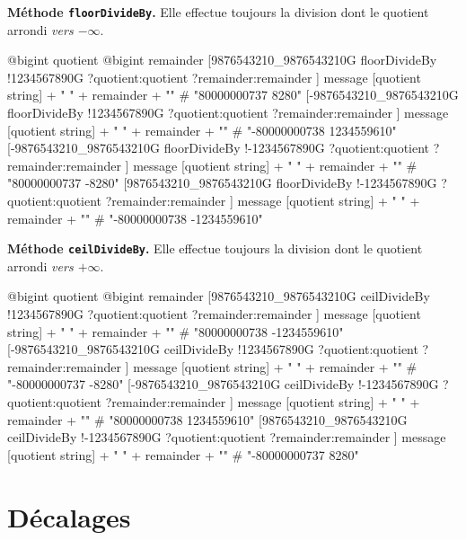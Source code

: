 \textbf{Méthode \texttt{floorDivideBy}.} Elle effectue toujours la division dont le quotient arrondi \emph{vers $-\infty$}.

\begin{galgas}
  @bigint quotient
  @bigint remainder
  [9876543210_9876543210G floorDivideBy
    !1234567890G
    ?quotient:quotient
    ?remainder:remainder
  ]
  message [quotient string] + " " + remainder + "\n" # "80000000737 8280"
  [-9876543210_9876543210G floorDivideBy
    !1234567890G
    ?quotient:quotient
    ?remainder:remainder
  ]
  message [quotient string] + " " + remainder + "\n" # "-80000000738 1234559610"
  [-9876543210_9876543210G floorDivideBy
    !-1234567890G
    ?quotient:quotient
    ?remainder:remainder
  ]
  message [quotient string] + " " + remainder + "\n" # "80000000737 -8280"
  [9876543210_9876543210G floorDivideBy
    !-1234567890G
    ?quotient:quotient
    ?remainder:remainder
  ]
  message [quotient string] + " " + remainder + "\n" # "-80000000738 -1234559610"
\end{galgas}






\textbf{Méthode \texttt{ceilDivideBy}.} Elle effectue toujours la division dont le quotient arrondi \emph{vers $+\infty$}.

\begin{galgas}
  @bigint quotient
  @bigint remainder
  [9876543210_9876543210G ceilDivideBy
    !1234567890G
    ?quotient:quotient
    ?remainder:remainder
  ]
  message [quotient string] + " " + remainder + "\n" # "80000000738 -1234559610"
  [-9876543210_9876543210G ceilDivideBy
    !1234567890G
    ?quotient:quotient
    ?remainder:remainder
  ]
  message [quotient string] + " " + remainder + "\n" # "-80000000737 -8280"
  [-9876543210_9876543210G ceilDivideBy
    !-1234567890G
    ?quotient:quotient
    ?remainder:remainder
  ]
  message [quotient string] + " " + remainder + "\n" # "80000000738 1234559610"
  [9876543210_9876543210G ceilDivideBy
    !-1234567890G
    ?quotient:quotient
    ?remainder:remainder
  ]
  message [quotient string] + " " + remainder + "\n" # "-80000000737 8280"
\end{galgas}








\section{Décalages}

